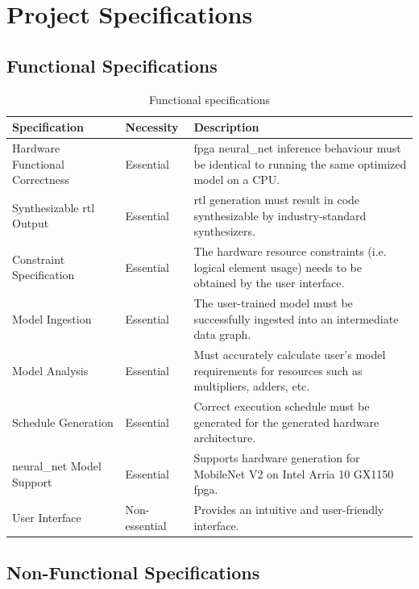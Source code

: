 \documentclass{uw-ece-wkrpt}
\begin{document}
\section{Project Specifications}

\subsection{Functional Specifications}

\begin{table}[H]
\centering
\caption{Functional specifications}\label{tab:func_specs}
\begin{tabularx}{\textwidth}{llX}
\toprule
Specification & Necessity & Description \\
\midrule
Hardware Functional Correctness & Essential & \gls{fpga} \gls{neural_net} inference behaviour must be identical to running the same optimized model on a CPU. \\
Synthesizable \gls{rtl} Output & Essential & \gls{rtl} generation must result in code synthesizable by industry-standard synthesizers. \\
Constraint Specification & Essential & The hardware resource constraints (i.e. logical element usage) needs to be obtained by the user interface. \\
Model Ingestion & Essential & The user-trained model must be successfully ingested into an intermediate data graph. \\
Model Analysis & Essential & Must accurately calculate user's model requirements for resources such as multipliers, adders, etc. \\
Schedule Generation & Essential & Correct execution schedule must be generated for the generated hardware architecture. \\
\gls{neural_net} Model Support & Essential & Supports hardware generation for MobileNet V2 on Intel Arria 10 GX1150 \gls{fpga}. \\
User Interface & Non-essential & Provides an intuitive and user-friendly interface. \\
\bottomrule
\end{tabularx}
\end{table}

\subsection{Non-Functional Specifications}
\end{document}
